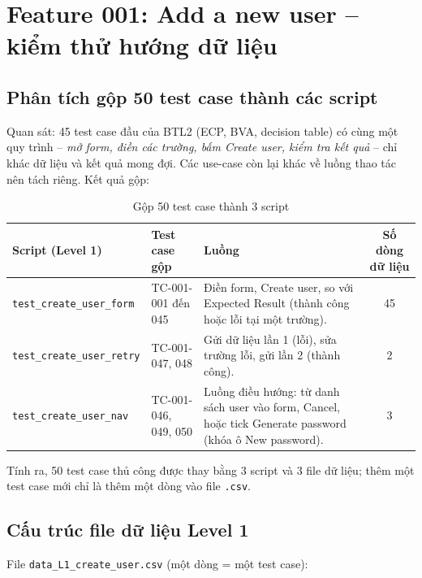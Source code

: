 \documentclass[12pt,a4paper]{article}
\begin{document}
\section{Feature 001: Add a new user -- kiểm thử hướng dữ liệu}

\subsection{Phân tích gộp 50 test case thành các script}
Quan sát: 45 test case đầu của BTL2 (ECP, BVA, decision table) có cùng một quy trình --
\emph{mở form, điền các trường, bấm Create user, kiểm tra kết quả} -- chỉ khác dữ liệu và kết quả mong đợi.
Các use-case còn lại khác về luồng thao tác nên tách riêng. Kết quả gộp:

\begin{table}[H]
\centering\small
\begin{tabular}{|L{4.4cm}|L{2.7cm}|L{4.6cm}|c|}
\hline
{}\textbf{Script (Level 1)} & \textbf{Test case gộp} & \textbf{Luồng} & \textbf{Số dòng dữ liệu} \\ \hline
\texttt{test\_create\_user\_form} & TC-001-001 đến 045 & Điền form, Create user, so với Expected Result (thành công hoặc lỗi tại một trường). & 45 \\ \hline
\texttt{test\_create\_user\_retry} & TC-001-047, 048 & Gửi dữ liệu lần 1 (lỗi), sửa trường lỗi, gửi lần 2 (thành công). & 2 \\ \hline
\texttt{test\_create\_user\_nav} & TC-001-046, 049, 050 & Luồng điều hướng: từ danh sách user vào form, Cancel, hoặc tick Generate password (khóa ô New password). & 3 \\ \hline
\end{tabular}
\caption{Gộp 50 test case thành 3 script}
\end{table}
Tính ra, 50 test case thủ công được thay bằng 3 script và 3 file dữ liệu; thêm một test case mới chỉ là thêm một dòng vào file \texttt{.csv}.

\subsection{Cấu trúc file dữ liệu Level 1}
File \texttt{data\_L1\_create\_user.csv} (một dòng = một test case):
\end{document}
